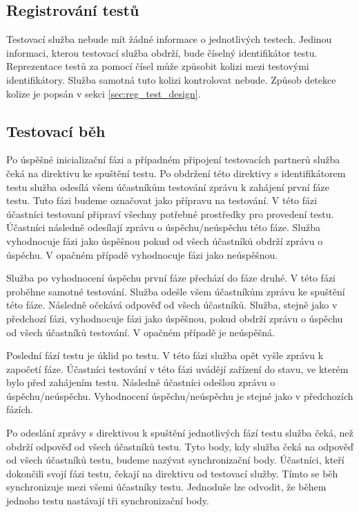 \subsection{Registrování testů}
Testovací služba nebude mít žádné informace o jednotlivých testech. Jedinou informaci, kterou testovací služba obdrží, bude číselný identifikátor testu. Reprezentace testů za pomocí čísel může způsobit kolizi mezi testovými identifikátory. Služba samotná tuto kolizi kontrolovat nebude. Způsob detekce kolize je popsán v sekci \ref{sec:reg_test_design}.

\subsection{Testovací běh}\label{sec:test_run}
Po úspěšné inicializační fázi a případném připojení testovacích partnerů služba čeká na direktivu ke spuštění testu. Po obdržení této direktivy s identifikátorem testu služba odesílá všem účastníkům testování zprávu k zahájení první fáze testu. Tuto fázi budeme označovat jako přípravu na testování. V této fázi účastníci testovaní připraví všechny potřebné prostředky pro provedení testu. Účastníci následně odesílají zprávu o úspěchu/neúspěchu této fáze. Služba vyhodnocuje fázi jako úspěšnou pokud od všech účastníků obdrží zprávu o úspěchu. V opačném případě vyhodnocuje fázi jako neúspěšnou.

Služba po vyhodnocení úspěchu první fáze přechází do fáze druhé. V této fázi proběhne samotné testování. Služba odešle všem účastníkům zprávu ke spuštění této fáze. Následně očekává odpověď od všech účastníků. Služba, stejně jako v předchozí fázi, vyhodnocuje fázi jako úspěšnou, pokud obdrží zprávu o úspěchu od všech účastníků testování. V opačném případě je neúspěšná.

Poslední fází testu je úklid po testu. V této fázi služba opět vyšle zprávu k započetí fáze. Účastníci testování v této fázi uvádějí zařízení do stavu, ve kterém bylo před zahájením testu. Následně účastníci odešlou zprávu o úspěchu/neúspěchu. Vyhodnocení úspěchu/neúspěchu je stejné jako v předchozích fázích.

Po odeslání zprávy s direktivou k spuštění jednotlivých fází testu služba čeká, než obdrží odpověď od všech účastníků testu. Tyto body, kdy služba čeká na odpověď od všech účastníků testu, budeme nazývat synchronizační body. Účastníci, kteří dokončili svojí fázi testu, čekají na direktivu od testovací služby. Tímto se běh synchronizuje mezi všemi účastníky testu. Jednoduše lze odvodit, že během jednoho testu nastávají tři synchronizační body. 

